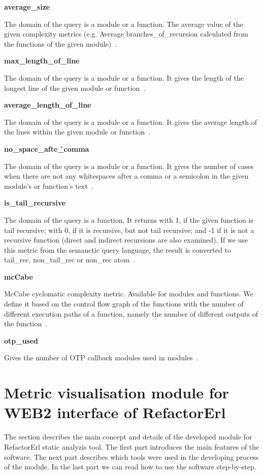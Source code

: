 \textbf{average\_size}

The domain of the query is a module or a function. The average value of the given complexity metrics (e.g. Average branches\_of\_recursion calculated from the functions of the given module)~\cite{refactorerl}.

\textbf{max\_length\_of\_line}

The domain of the query is a module or a function. It gives the length of the longest line of the given module or function~\cite{refactorerl}.

\textbf{average\_length\_of\_line}

The domain of the query is a module or a function. It gives the average length of the lines within the given module or function~\cite{refactorerl}.

\textbf{no\_space\_afte\r\_comma}

The domain of the query is a module or a function. It gives the number of cases when there are not any whitespaces after a comma or a semicolon in the given module's or function's text~\cite{refactorerl}.

\textbf{is\_tail\_recursive}

The domain of the query is a function. It returns with 1, if the given function is tail recursive; with 0, if it is recursive, but not tail recursive; and -1 if it is not a recursive function (direct and indirect recursions are also examined). If we use this metric from the
semanctic query language, the result is converted to tail\_rec, non\_tail\_rec or non\_rec atom~\cite{refactorerl}.

\textbf{mcCabe}

McCabe cyclomatic complexity metric. Available for modules and functions. We define it based on the control flow graph of the functions with the number of different execution paths of a function, namely the number of different outputs of the function~\cite{refactorerl}.

\textbf{otp\_used}

Gives the number of OTP callback modules used in modules~\cite{refactorerl}.

\section{Metric visualisation module for WEB2 interface of RefactorErl}

The section describes the main concept and details of the developed module for RefactorErl static analyzis tool. The first part introduces the main features of the software. The next part describes which tools were used in the developing process of the module. In the last part we can read how to use the software step-by-step.

